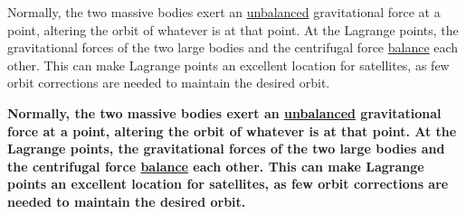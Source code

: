 Normally, the two massive bodies exert an \underline{unbalanced} gravitational force at a point, altering the orbit of whatever is at that point. At the Lagrange points, the gravitational forces of the two large bodies and the centrifugal force \underline{balance} each other. This can make Lagrange points an excellent location for satellites, as few orbit corrections are needed to maintain the desired orbit. 

\textbf{Normally, the two massive bodies exert an \underline{unbalanced} gravitational force at a point, altering the orbit of whatever is at that point. At the Lagrange points, the gravitational forces of the two large bodies and the centrifugal force \underline{balance} each other. This can make Lagrange points an excellent location for satellites, as few orbit corrections are needed to maintain the desired orbit.}

